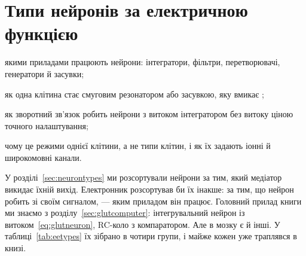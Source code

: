 \chapter{Типи нейронів за електричною функцією}
\label{sec:eetypes}
\begin{chaptergoals}
\item якими приладами працюють нейрони: інтегратори, фільтри, перетворювачі, генератори й засувки;
\item як одна клітина стає смуговим резонатором або засувкою, яку вмикає ;
\item як зворотний зв'язок робить нейрони з витоком інтегратором без витоку ціною точного налаштування;
\item чому це режими однієї клітини, а не типи клітин, і як їх задають іонні й широкомовні канали.
\end{chaptergoals}

У розділі~\ref{sec:neurontypes} ми розсортували нейрони за тим, який медіатор викидає їхній вихід. Електронник розсортував би їх інакше: за тим, що нейрон робить зі своїм сигналом, --- яким приладом він працює. Головний прилад книги ми знаємо з розділу~\ref{sec:glutcomputer}: інтегрувальний нейрон із витоком~\eqref{eq:glutneuron}, RC-коло з компаратором. Але в мозку є й інші. У таблиці~\ref{tab:eetypes} їх зібрано в чотири групи, і майже кожен уже траплявся в книзі.


